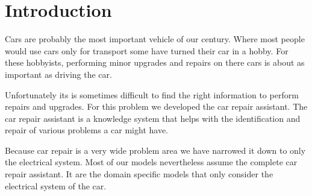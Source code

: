 \section{Introduction}
Cars are probably the most important vehicle of our century. Where most people would use cars only for transport some have turned their car in a hobby. For these hobbyists, performing minor upgrades and repairs on there cars is about as important as driving the car.

Unfortunately its is sometimes difficult to find the right information to perform repairs and upgrades. For this problem we developed the car repair assistant. The car repair assistant is a knowledge system that helps with the identification and repair of various problems a car might have.

Because car repair is a very wide problem area we have narrowed it down to only the electrical system. Most of our models nevertheless assume the complete car repair assistant. It are the domain specific models that only consider the electrical system of the car. 

